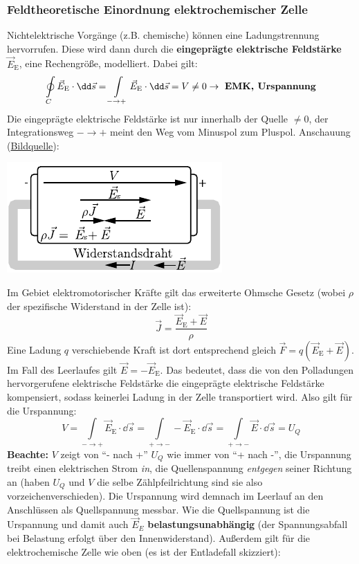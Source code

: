 	        \subsubsection{Feldtheoretische Einordnung elektrochemischer Zelle}
	        Nichtelektrische Vorgänge (z.B. chemische) können eine Ladungstrennung hervorrufen. Diese wird dann durch die \textbf{eingeprägte elektrische Feldstärke} \(\vec{E}_\mathrm{E} \), eine Rechengröße, modelliert. Dabei gilt:
		              \begin{equation}
			              \oint\limits_{C} \vec{E}_\mathrm{E}\cdot \dd\vec{s} = \int\limits_{-\to +} \vec{E}_\mathrm{E}\cdot \dd\vec{s}  = V \neq 0 \to \text{ \textbf{EMK, Urspannung}}
		              \end{equation}
		   Die eingeprägte elektrische Feldstärke ist nur innerhalb der Quelle $\neq 0$, der Integrationsweg $-\to +$ meint den Weg vom Minuspol zum Pluspol. Anschauung (\href{https://commons.wikimedia.org/wiki/File:ElektromotorischeKraft.svg}{Bildquelle}):
		   \begin{center}
		   	\includegraphics{res/Urspannung.pdf}
		   \end{center}
	   Im Gebiet elektromotorischer Kräfte gilt das erweiterte Ohmsche Gesetz (wobei $\rho$  der spezifische Widerstand in der Zelle ist):
	   \begin{equation}
	   	\vec{J}=\frac{\vec{E}_\mathrm{E}+\vec{E}}{\rho}
	   \end{equation}
	   Eine Ladung $q$ verschiebende Kraft ist dort entsprechend gleich $\vec{F}=q\left(\vec{E}_\mathrm{E}+\vec{E}\right)$.  Im Fall des Leerlaufes gilt $\vec{E} =- \vec{E}_\mathrm{E}$. Das bedeutet, dass die von den Polladungen hervorgerufene elektrische Feldstärke die eingeprägte elektrische Feldstärke kompensiert, sodass keinerlei Ladung in der Zelle transportiert wird. Also gilt für die Urspannung: $$V=\int\limits_{-\to +} \vec{E}_\mathrm{E}\cdot \dd\vec{s}=\int\limits_{+\to-} -\vec{E}_\mathrm{E}\cdot \dd\vec{s}=\int\limits_{+\to -} \vec{E}\cdot \dd\vec{s}=U_Q$$ \textbf{Beachte:} $V$ zeigt von \enquote{- nach +} $U_Q$ wie immer von \enquote{+ nach -}, die Urspannung treibt einen elektrischen Strom \textit{in}, die Quellenspannung \textit{entgegen} seiner Richtung an (haben $U_Q$ und $V$ die selbe Zählpfeilrichtung sind sie also vorzeichenverschieden).  Die Urspannung wird demnach im Leerlauf an den Anschlüssen als Quellspannung messbar. Wie die Quellspannung ist die Urspannung und damit auch $\vec{E}_E$ \textbf{belastungsunabhängig} (der Spannungsabfall bei Belastung erfolgt über den Innenwiderstand). Außerdem gilt für die elektrochemische Zelle wie oben (es ist der Entladefall skizziert):
